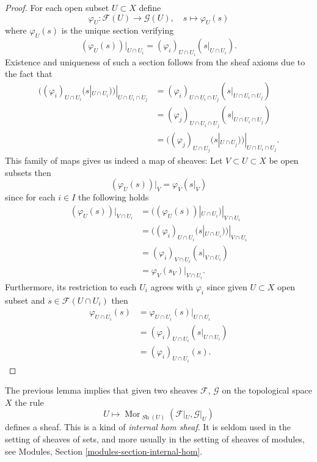\documentclass{stacks-project}
\theoremstyle{plain}
\theoremstyle{definition}
\theoremstyle{remark}
\numberwithin{equation}{subsection}
\def\Mor{\mathop{\mathrm{Mor}}\nolimits}
\def\Sh{\mathop{\mathit{Sh}}\nolimits}
\begin{document}
\begin{proof}
For each open subset $U \subset X$ define
$$
\varphi_U : \mathcal{F}(U) \to \mathcal{G}(U), \quad
s \mapsto \varphi_U(s)
$$
where $\varphi_U(s)$ is the unique section verifying
$$
(\varphi_U(s))|_{U \cap U_i}
= (\varphi_i)_{U \cap U_i}(s|_{U \cap U_i}).
$$
Existence and uniqueness of such a section
follows from the sheaf axioms
due to the fact that
\begin{align*}
((\varphi_i)_{U \cap U_i}(s|_{U \cap U_i}))|_{U \cap U_i \cap U_j}
&= (\varphi_i)_{U \cap U_i \cap U_j}(s|_{U \cap U_i \cap U_j})\\
&= (\varphi_j)_{U \cap U_i \cap U_j}(s|_{U \cap U_i \cap U_j})\\
&= ((\varphi_j)_{U \cap U_j}(s|_{U \cap U_j}))|_{U \cap U_i \cap U_j}.
\end{align*}
This family of maps gives us indeed a map of sheaves:
Let $V \subset U \subset X$ be open subsets then
$$
(\varphi_U(s))|_V
= \varphi_V(s|_V)
$$
since for each $i \in I$ the following holds
\begin{align*}
(\varphi_U(s))|_{V \cap U_i}
&= ((\varphi_U(s))|_{U \cap U_i})|_{V \cap U_i}\\
&= ((\varphi_i)_{U \cap U_i}(s|_{U \cap U_i}))|_{V \cap U_i}\\
&= (\varphi_i)_{V \cap U_i}(s|_{V \cap U_i})\\
&= \varphi_V(s_{V})|_{V \cap U_i}.
\end{align*}
Furthermore,
its restriction to each $U_i$ agrees with $\varphi_i$
since given $U \subset X$ open subset
and $s \in \mathcal{F}(U \cap U_i)$ then
\begin{align*}
\varphi_{U \cap U_i}(s)
&= \varphi_{U \cap U_i}(s)|_{U \cap U_i}\\
&= (\varphi_i)_{U \cap U_i}(s|_{U \cap U_i})\\
&= (\varphi_i)_{U \cap U_i}(s).
\end{align*}
\end{proof}

\noindent
The previous lemma implies that given two sheaves $\mathcal{F}$,
$\mathcal{G}$ on the topological space $X$ the rule
$$
U \longmapsto
\Mor_{\Sh(U)}(
\mathcal{F}|_U, \mathcal{G}|_U)
$$
defines a sheaf. This is a kind of {\it internal hom sheaf}. It is
seldom used in the setting of sheaves of sets, and more usually
in the setting of sheaves of modules, see
Modules, Section \ref{modules-section-internal-hom}.
\end{document}
